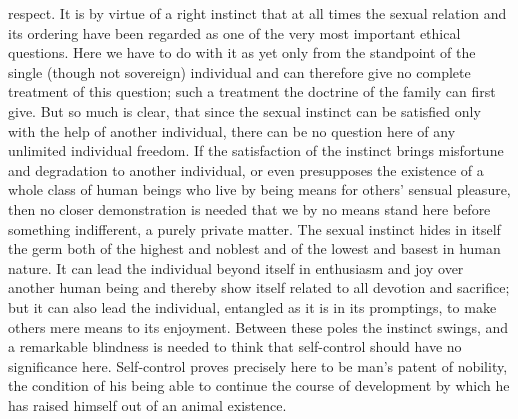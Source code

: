 \documentclass[12pt,a4paper,openany]{book}
\newcommand{\opage}[1]{\marginnote{\footnotesize\textit{[#1]}}}
\begin{document}
respect. It is by virtue of a right instinct that at all times the sexual relation and its ordering have been
regarded as one of the very most important ethical questions. Here we have to do with it as yet only from the
standpoint of the single (though not sovereign) individual and can therefore give no complete treatment of this
question; such a treatment the doctrine of the family can first give. But so much is clear, that since the sexual
instinct can be satisfied only with the help of another individual, there can be no question here of any
unlimited individual freedom. If the satisfaction of the instinct brings misfortune and degradation to another
individual, or even presupposes the existence of a whole class of human beings who live by being means for others'
sensual pleasure, then no closer demonstration is needed that we by no means stand here before something
indifferent, a purely private matter. The sexual instinct hides in itself the germ both of the highest and noblest
and of the lowest and basest in human nature. It can lead the individual beyond itself in enthusiasm and joy over
another
\opage{228}human being and thereby show itself related to all devotion and sacrifice; but it can also lead the
individual, entangled as it is in its promptings, to make others mere means to its enjoyment. Between these poles
the instinct swings, and a remarkable blindness is needed to think that self-control should have no significance
here. Self-control proves precisely here to be man's patent of nobility, the condition of his being able to
continue the course of development by which he has raised himself out of an animal existence.
\end{document}
